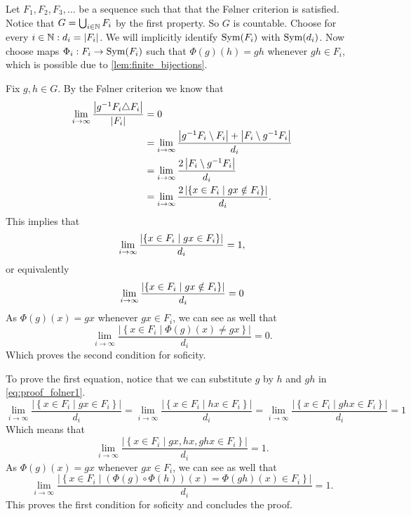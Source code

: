 Let $F_1, F_2, F_3, \dots $ be a sequence such that that the Følner criterion is satisfied. Notice that $G = \bigcup_{i \in \mathbb{N}} F_i$ by the first property. So $G$ is countable. 
Choose for every $i \in \mathbb{N}: d_i = |F_i|$. We will implicitly identify $\operatorname{Sym}(F_i)$ with $\operatorname{Sym}(d_i)$. Now choose maps $\Phi_i: F_i \to \operatorname{Sym}(F_i)$ such that $\Phi(g)(h) = gh$ whenever $gh \in F_i$, which is possible due to \cref{lem:finite_bijections}. 

Fix $g, h \in G$. By the Følner criterion we know that 
\begin{align*}
    \lim_{i\to \infty} \frac{\left| g^{-1}F_i \triangle F_i \right|}{\left| F_i \right|} &= 0\\
    &= \lim_{i\to \infty} \frac{\left| g^{-1}F_i \setminus F_i \right| + \left| F_i \setminus g^{-1}F_i \right|}{d_i}\\
    &= \lim_{i\to \infty} \frac{2\left|  F_i \setminus g^{-1}F_i  \right|}{d_i}\\
    &= \lim_{i\to \infty} \frac{2\left| \left\{ x \in F_i \mid gx \notin F_i \right\} \right|}{d_i}. 
\end{align*}
This implies that \begin{equation}
    \lim_{i\to \infty} \frac{\left| \left\{ x \in F_i \mid gx \in F_i \right\} \right|}{d_i} = 1,
\end{equation}
or equivalently 
\begin{equation}\label{eq:proof_folner1}
    \lim_{i\to \infty} \frac{\left| \left\{ x \in F_i \mid gx \notin F_i \right\} \right|}{d_i} = 0
\end{equation}
As $\Phi(g)(x) = gx$ whenever $gx \in F_i$, we can see as well that 
$$\lim_{i\to \infty} \frac{\left|\left\{ x \in F_i \mid \Phi(g)(x)\ne gx \right\}\right|}{d_i} = 0.$$
Which proves the second condition for soficity. 

To prove the first equation, notice that we can substitute $g$ by $h$ and $gh$ in \cref{eq:proof_folner1}.
$$ \lim_{i\to \infty} \frac{\left|\left\{ x \in F_i \mid gx \in F_i \right\}\right|}{d_i} =
\lim_{i\to \infty} \frac{\left|\left\{ x \in F_i \mid hx \in F_i \right\}\right|}{d_i} =
\lim_{i\to \infty} \frac{\left|\left\{ x \in F_i \mid ghx \in F_i \right\}\right|}{d_i}= 1$$
Which means that 
$$\lim_{i\to \infty} \frac{\left|\left\{ x \in F_i \mid gx,hx,ghx \in F_i \right\}\right|}{d_i}= 1.$$
As $\Phi(g)(x) = gx$ whenever $gx \in F_i$, we can see as well that
$$\lim_{i\to \infty} \frac{\left|\left\{ x \in F_i \mid (\Phi(g) \circ\Phi(h))(x) = \Phi(gh)(x) \in F_i \right\}\right|}{d_i}= 1.$$
This proves the first condition for soficity and concludes the proof. 
